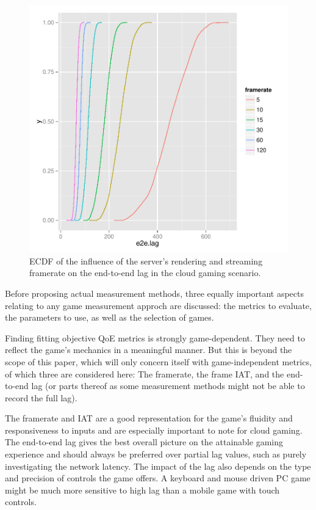 \begin{figure}[!t]
	\centering
	\includegraphics[width=1.0\columnwidth]{../simulation/visualization/cloudgaming-lag-cdf.pdf}
	\caption{\acrshort{ECDF} of the influence of the server's rendering and streaming framerate on the end-to-end lag in the cloud gaming scenario.}
\label{fig:cloud-e2e-delay-sim}
\end{figure}










Before proposing actual measurement methods, three equally important aspects relating to any game measurement approch are discussed: the metrics to evaluate, the parameters to use, as well as the selection of games. 

Finding fitting objective \gls{QoE} metrics is strongly game-dependent. They need to reflect the game's mechanics in a meaningful manner. But this is beyond the scope of this paper, which will only concern itself with game-independent metrics, of which three are considered here: The framerate, the frame \gls{IAT}, and the end-to-end lag (or parts thereof as some measurement methods might not be able to record the full lag).

The framerate and \gls{IAT} are a good representation for the game's fluidity and responsiveness to inputs and are especially important to note for cloud gaming. The end-to-end lag gives the best overall picture on the attainable gaming experience and should always be preferred over partial lag values, such as purely investigating the network latency. The impact of the lag also depends on the type and precision of controls the game offers. A keyboard and mouse driven PC game might be much more sensitive to high lag than a mobile game with touch controls.


